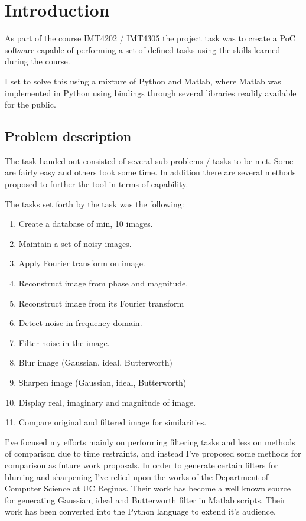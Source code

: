\chapter{Introduction}\label{sec:intro}
As part of the course IMT4202 / IMT4305 the project task was to create a PoC
software capable of performing a set of defined tasks using the skills learned
during the course.

I set to solve this using a mixture of Python and Matlab, where Matlab was
implemented in Python using bindings through several libraries readily available
for the public.

\section{Problem description}\label{sec:}
The task handed out consisted of several sub-problems / tasks to be met. Some
are fairly easy and others took some time.  In addition there are several
methods proposed to further the tool in terms of capability.

The tasks set forth by the task was the following:
\begin{multicols}{2}
\begin{enumerate}
	\item Create a database of min, 10 images.
	\item Maintain a set of noisy images.

	\item Apply Fourier transform on image.
	\item Reconstruct image from phase and magnitude.
	\item Reconstruct image from its Fourier transform
	\item Detect noise in frequency domain.
	
	\item Filter noise in the image.
	\item Blur image (Gaussian, ideal, Butterworth)
	\item Sharpen image (Gaussian, ideal, Butterworth)
	
	\item Display real, imaginary and magnitude of image.
	\item Compare original and filtered image for similarities.
\end{enumerate}
\end{multicols}


I've focused my efforts mainly on performing filtering tasks and less on
methods of comparison due to time restraints, and instead I've proposed some
methods for comparison as future work proposals.  In order to generate certain
filters for blurring and sharpening I've relied upon the works of the Department
of Computer Science at UC Reginas.  Their work has become a well known source
for generating Gaussian, ideal and Butterworth filter in Matlab scripts. Their
work has been converted into the Python language to extend it's audience.

